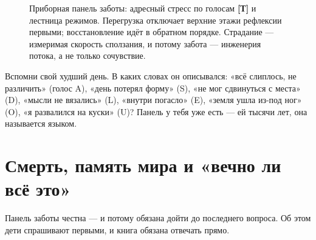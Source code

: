 \documentclass[11pt,letterpaper]{article}
\newcommand{\stT}{\textbf{[Т]}\xspace}
\begin{document}
\begin{figure}[H]
\centering
{}
\caption{Приборная панель заботы: адресный стресс по голосам \stT{} и
лестница режимов. Перегрузка отключает верхние этажи рефлексии
первыми; восстановление идёт в обратном порядке. Страдание ---
измеримая скорость сползания, и потому забота --- инженерия потока,
а не только сочувствие.}
\label{fig:gauge}
\end{figure}

\begin{askbox}
Вспомни свой худший день. В каких словах он описывался: «всё
слиплось, не различить» (голос A), «день потерял форму» (S), «не
мог сдвинуться с места» (D), «мысли не вязались» (L), «внутри
погасло» (E), «земля ушла из-под ног» (O), «я развалился на куски»
(U)? Панель у тебя уже есть --- ей тысячи лет, она называется
языком.
\end{askbox}

\section{Смерть, память мира и «вечно ли всё это»}
\label{sec:death}

Панель заботы честна --- и потому обязана дойти до последнего
вопроса. Об этом дети спрашивают первыми, и книга обязана отвечать
прямо.
\end{document}
